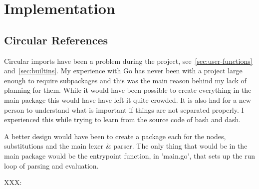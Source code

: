 \chapter{Implementation}











\section{Circular References}
\label{sec:circular-refs}
Circular imports have been a problem during the project, see~\ref{sec:user-functions} and~\ref{sec:builtins}.
My experience with Go has never been with a project large enough to require subpackages and this was the main reason behind my lack of planning for them.
While it would have been possible to create everything in the main package this would have have left it quite crowded.
It is also had for a new person to understand what is important if things are not separated properly.
I experienced this while trying to learn from the source code of bash and dash.

A better design would have been to create a package each for the nodes, substitutions and the main lexer \& parser.
The only thing that would be in the main package would be the entrypoint function, in 'main.go', that sets up the run loop of parsing and evaluation.

XXX: